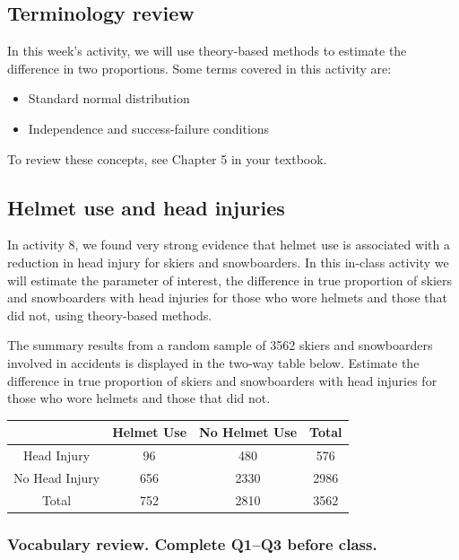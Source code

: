 \documentclass[
]{report}
\begin{document}
\hypertarget{terminology-review-8}{%
\subsection{Terminology review}\label{terminology-review-8}}

In this week's activity, we will use theory-based methods to estimate the difference in two proportions. Some terms covered in this activity are:

\begin{itemize}
\item
  Standard normal distribution
\item
  Independence and success-failure conditions
\end{itemize}

To review these concepts, see Chapter 5 in your textbook.

\hypertarget{helmet-use-and-head-injuries-1}{%
\subsection{Helmet use and head injuries}\label{helmet-use-and-head-injuries-1}}

In activity 8, we found very strong evidence that helmet use is associated with a reduction in head injury for skiers and snowboarders. In this in-class activity we will estimate the parameter of interest, the difference in true proportion of skiers and snowboarders with head injuries for those who wore helmets and those that did not, using theory-based methods.

The summary results from a random sample of 3562 skiers and snowboarders involved in accidents is displayed in the two-way table below. Estimate the difference in true proportion of skiers and snowboarders with head injuries for those who wore helmets and those that did not.

\begin{longtable}[]{@{}cccc@{}}
\toprule
& Helmet Use & No Helmet Use & Total\tabularnewline
\midrule
\endhead
Head Injury & 96 & 480 & 576\tabularnewline
No Head Injury & 656 & 2330 & 2986\tabularnewline
Total & 752 & 2810 & 3562\tabularnewline
\bottomrule
\end{longtable}

\hypertarget{vocabulary-review.-complete-q1q3-before-class.-2}{%
\subsubsection*{Vocabulary review. Complete Q1--Q3 before class.}\label{vocabulary-review.-complete-q1q3-before-class.-2}}
\end{document}
